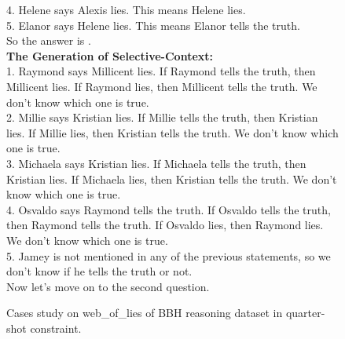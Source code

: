 \begin{figure*}[htb]
\begin{tcolorbox}
    4. Helene says Alexis lies. This means Helene lies.\\
    5. Elanor says Helene lies. This means Elanor tells the truth.\\
    So the answer is .\\
    \textbf{The Generation of Selective-Context:}\\
    1. Raymond says Millicent lies. If Raymond tells the truth, then Millicent lies. If Raymond lies, then Millicent tells the truth. We don't know which one is true.\\
    2. Millie says Kristian lies. If Millie tells the truth, then Kristian lies. If Millie lies, then Kristian tells the truth. We don't know which one is true.\\
    3. Michaela says Kristian lies. If Michaela tells the truth, then Kristian lies. If Michaela lies, then Kristian tells the truth. We don't know which one is true.\\
    4. Osvaldo says Raymond tells the truth. If Osvaldo tells the truth, then Raymond tells the truth. If Osvaldo lies, then Raymond lies. We don't know which one is true.\\
    5. Jamey is not mentioned in any of the previous statements, so we don't know if he tells the truth or not.\\
    Now let's move on to the second question.
    \end{tcolorbox}
    \caption{Cases study on web\_of\_lies of BBH reasoning dataset in quarter-shot constraint.}
    \label{fig:case_bbh}
\end{figure*}


